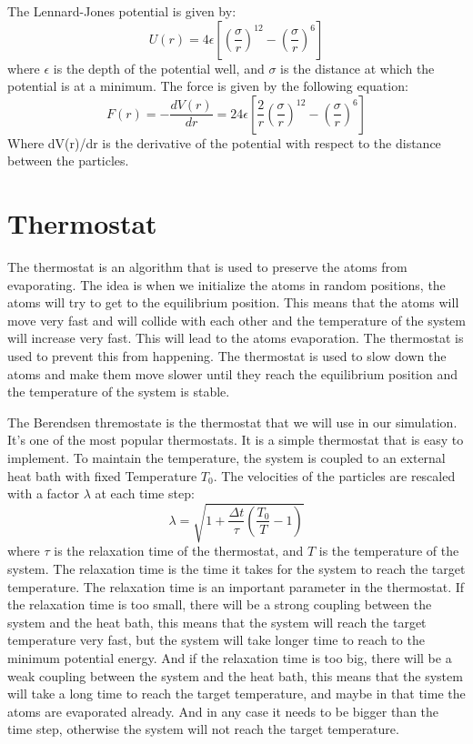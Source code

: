     The Lennard-Jones potential \cite{molDymCourse} is given by:
    \begin{equation}
        U(r) = 4\epsilon\left[\left(\frac{\sigma}{r}\right)^{12}-\left(\frac{\sigma}{r}\right)^6\right]
    \end{equation}
    where $\epsilon$ is the depth of the potential well, and $\sigma$ is the distance at which the potential is at a minimum.
    The force is given by the following equation:
    \begin{equation}
        F(r) = -\frac{dV(r)}{dr} = 24\epsilon\left[\frac{2}{r}\left(\frac{\sigma}{r}\right)^{12}-\left(\frac{\sigma}{r}\right)^6\right]
    \end{equation}
    Where dV(r)/dr is the derivative of the potential with respect to the distance between the particles.


\section{Thermostat}
    The thermostat is an algorithm that is used to preserve the atoms from evaporating. The idea is when we initialize the atoms in random positions, the atoms will try to get to the equilibrium position. This means that the atoms will move very fast and will collide with each other and the temperature of the system will increase very fast. This will lead to the atoms evaporation. The thermostat is used to prevent this from happening. The thermostat is used to slow down the atoms and make them move slower until they reach the equilibrium position and the temperature of the system is stable. 
    
    The Berendsen thremostate\cite{berendsen1984molecular} is the thermostat that we will use in our simulation. It's one of the most popular thermostats. It is a simple thermostat that is easy to implement. To maintain the temperature, the system is coupled to an external heat bath with fixed Temperature $T_{0}$. The
    velocities of the particles are rescaled with a factor $\lambda$ at each time step:
    \begin{equation}
        \lambda = \sqrt{1+\frac{\Delta t}{\tau}\left(\frac{T_{0}}{T}-1\right)}
    \end{equation}
    where $\tau$ is the relaxation time of the thermostat, and $T$ is the temperature of the system. The relaxation time is the time it takes for the system to reach the target temperature. The relaxation time is an important parameter in the thermostat. If the relaxation time is too small, there will be a strong coupling between the system and the heat bath, this means that the system will reach the target temperature very fast, but the system will take longer time to reach to the minimum potential energy. And if the relaxation time is too big, there will be a weak coupling between the system and the heat bath, this means that the system will take a long time to reach the target temperature, and maybe in that time the atoms are evaporated already.
    And in any case it needs to be bigger than the time step, otherwise the system will not reach the target temperature.


